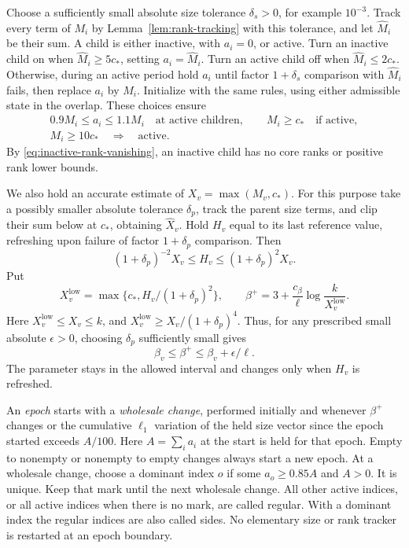 Choose a sufficiently small absolute size tolerance $\delta_s>0$,
for example $10^{-3}$.  Track every term of $M_i$ by
Lemma~\ref{lem:rank-tracking} with this tolerance, and let
$\widehat M_i$ be their sum.  A child is either inactive, with $a_i=0$,
or active.  Turn an inactive child on when $\widehat M_i\ge5c_*$,
setting $a_i=\widehat M_i$.  Turn an active child off when
$\widehat M_i\le2c_*$.  Otherwise, during an active period hold $a_i$
until factor $1+\delta_s$ comparison with $\widehat M_i$ fails,
then replace $a_i$ by $\widehat M_i$.  Initialize with the same rules,
using either admissible state in the overlap.  These choices ensure
\begin{equation}\label{eq:active-size-accuracy}
 \begin{gathered}
 0.9M_i\le a_i\le1.1M_i\quad\text{at active children},\qquad
 M_i\ge c_*\quad\text{if active},\\
 M_i\ge10c_*\quad\Longrightarrow\quad\text{active}.
 \end{gathered}
\end{equation}
By \eqref{eq:inactive-rank-vanishing}, an inactive child has no core
ranks or positive rank lower bounds.

We also hold an accurate estimate of $X_v=\max(M_v,c_*)$.
For this purpose take a possibly smaller absolute tolerance $\delta_p$,
track the parent size terms, and clip their sum below at $c_*$,
obtaining $\widehat X_v$.  Hold $H_v$ equal to its last reference value,
refreshing upon failure of factor $1+\delta_p$ comparison.  Then
\[
 (1+\delta_p)^{-2}X_v\le H_v\le(1+\delta_p)^2X_v.
\]
Put
\begin{equation}\label{eq:held-beta-upper}
 X_v^{\mathrm{low}}=\max\{c_*,H_v/(1+\delta_p)^2\},\qquad
 \beta^+=3+\frac{c_\beta}{\ell}\log\frac{k}{X_v^{\mathrm{low}}}.
\end{equation}
Here $X_v^{\mathrm{low}}\le X_v\le k$, and
$X_v^{\mathrm{low}}\ge X_v/(1+\delta_p)^4$.  Thus, for any prescribed
small absolute $\epsilon>0$, choosing $\delta_p$ sufficiently small gives
\begin{equation}\label{eq:beta-upper-error}
       \beta_v\le\beta^+\le\beta_v+\epsilon/\ell.
\end{equation}
The parameter stays in the allowed interval and changes only when
$H_v$ is refreshed.

An \emph{epoch} starts with a \emph{wholesale change}, performed initially
and whenever $\beta^+$ changes or the cumulative $\ell_1$ variation of
the held size vector since the epoch started exceeds $A/100$.
Here $A=\sum_i a_i$ at the start is held for that epoch.  Empty to
nonempty or nonempty to empty changes always start a new epoch.
At a wholesale change, choose a dominant index $o$ if some
$a_o\ge0.85A$ and $A>0$.  It is unique.  Keep that mark until the
next wholesale change.  All other active indices, or all active indices
when there is no mark, are called regular.  With a dominant index the
regular indices are also called sides.  No elementary size or rank
tracker is restarted at an epoch boundary.

